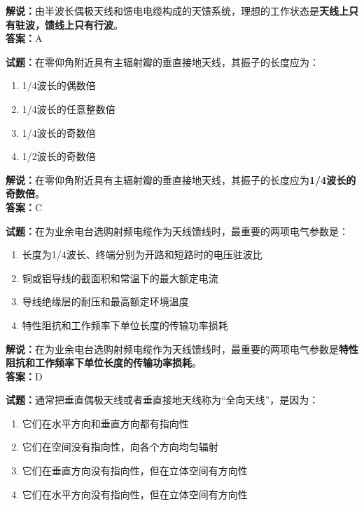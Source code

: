 \documentclass{ctexbook}
\begin{document}
\noindent\textbf{解说：}由半波长偶极天线和馈电电缆构成的天馈系统，理想的工作状态是\textbf{天线上只有驻波，馈线上只有行波}。\\\noindent\textbf{答案：}A%


\bigskip


\noindent\textbf{试题：}在零仰角附近具有主辐射瓣的垂直接地天线，其振子的长度应为：

\begin{enumerate}[leftmargin=3em]
	\item 1/4波长的偶数倍
	\item 1/4波长的任意整数倍
	\item 1/4波长的奇数倍
	\item 1/2波长的奇数倍
\end{enumerate}

\noindent\textbf{解说：}在零仰角附近具有主辐射瓣的垂直接地天线，其振子的长度应为\textbf{1/4波长的奇数倍}。\\\noindent\textbf{答案：}C%


\bigskip


\noindent\textbf{试题：}在为业余电台选购射频电缆作为天线馈线时，最重要的两项电气参数是：

\begin{enumerate}[leftmargin=3em]
	\item 长度为1/4波长、终端分别为开路和短路时的电压驻波比
	\item 铜或铝导线的截面积和常温下的最大额定电流
	\item 导线绝缘层的耐压和最高额定环境温度
	\item 特性阻抗和工作频率下单位长度的传输功率损耗
\end{enumerate}

\noindent\textbf{解说：}在为业余电台选购射频电缆作为天线馈线时，最重要的两项电气参数是\textbf{特性阻抗和工作频率下单位长度的传输功率损耗}。\\\noindent\textbf{答案：}D%


\bigskip


\noindent\textbf{试题：}通常把垂直偶极天线或者垂直接地天线称为“全向天线”，是因为：

\begin{enumerate}[leftmargin=3em]
	\item 它们在水平方向和垂直方向都有指向性
	\item 它们在空间没有指向性，向各个方向均匀辐射
	\item 它们在垂直方向没有指向性，但在立体空间有方向性
	\item 它们在水平方向没有指向性，但在立体空间有方向性
\end{enumerate}
\end{document}
